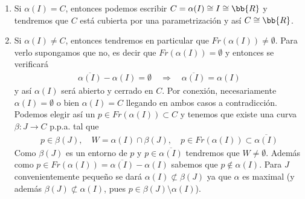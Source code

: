 \begin{observacion}
\begin{enumerate}
        \begin{enumerate}
            \item Si $\alpha(I)=C$, entonces podemos escribir $C=\alpha(I)\cong I \cong \bb{R}$ y tendremos que $C$ está cubierta por una parametrización y así $C\cong \bb{R}$.
            \item Si $\alpha(I)\neq C$, entonces tendremos en particular que $Fr(\alpha(I))\neq \emptyset$. Para verlo supongamos que no, es decir que $Fr(\alpha(I))=\emptyset$ y entonces se verificará
            \begin{gather*}
                \overline{\alpha(I)} - \alpha(I) =\emptyset \quad \Rightarrow \quad \overline{\alpha(I)} = \alpha(I)
            \end{gather*}
            y así $\alpha(I)$ será abierto y cerrado en $C$. Por conexión, necesariamente $\alpha(I)=\emptyset$ o bien $\alpha(I)=C$ llegando en ambos casos a contradicción. \\

            Podemos elegir así un $p\in Fr(\alpha(I)) \subset C$ y tenemos que existe una curva $\beta:J\to C$ p.p.a. tal que 
            \begin{gather*}
                p\in \beta(J), \quad W=\alpha(I)\cap \beta(J), \quad p\in Fr(\alpha(I))\subset \overline{\alpha(I)}
            \end{gather*}
            Como $\beta(J)$ es un entorno de $p$ y $p\in \overline{\alpha(I)}$ tendremos que $W\neq \emptyset$. Además como $p\in Fr(\alpha(I))=\overline{\alpha(I)} - \alpha(I)$ sabemos que $p\notin \alpha(I)$. Para $J$ convenientemente pequeño se dará $\alpha(I)\not\subset \beta(J)$ ya que $\alpha$ es maximal (y además $\beta(J)\not\subset\alpha(I)$, pues $p\in\beta(J)\setminus\alpha(I)$).

            \begin{figure}[H]
                \centering
                \begin{subfigure}[c]{0.60\textwidth}
                    \centering
\end{subfigure}
\end{figure}
\end{enumerate}
\end{enumerate}
\end{observacion}
